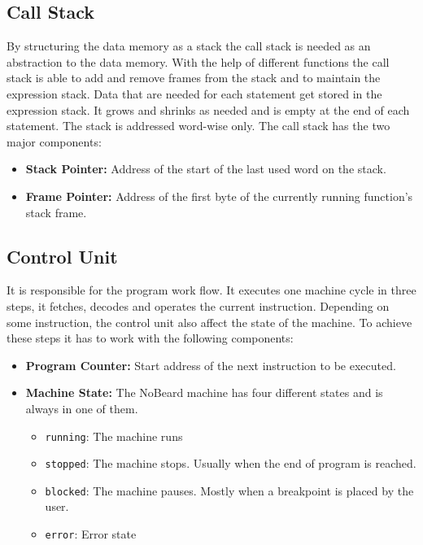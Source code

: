 \subsection{Call Stack}
By structuring the data memory as a stack the call stack is needed as an abstraction to the data memory. With the help of different functions the call stack is able to add and remove frames from the stack and to maintain the expression stack. Data that are needed for each statement get stored in the expression stack. It grows and shrinks as needed and is empty at the end of each statement. The stack is addressed word-wise only. The call stack has the two major components:

\begin{itemize}
\item \textbf{Stack Pointer: }Address of the start of the last used word on the stack. 
\item \textbf{Frame Pointer: }Address of the first byte of the currently running function's stack frame. 
\end{itemize}

\subsection{Control Unit}
It is responsible for the program work flow. It executes one machine cycle in three steps, it fetches, decodes and operates the current instruction. Depending on some instruction, the control unit also affect the state of the machine. To achieve these steps it has to work with the following components:

\begin{itemize}
\item \textbf{Program Counter: }Start address of the next instruction to be executed.
\item \textbf{Machine State: }The NoBeard machine has four different states and is always in one of them. 
	\begin{itemize}
		\item \lstinline$running$: The machine runs
		\item \lstinline$stopped$: The machine stops. Usually when the end of program is reached.
		\item \lstinline$blocked$: The machine pauses. Mostly when a breakpoint is placed by the user.
		\item \lstinline$error$: Error state
	\end{itemize}
\end{itemize}

